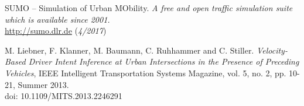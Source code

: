 \documentclass[11pt,letterpaper]{article}
\begin{document}
\begin{thebibliography}{5}
  		 SUMO – Simulation of Urban MObility.
  		\textit{A free and open traffic simulation suite which is available since 2001.}
  		\\\url{http://sumo.dlr.de} (\textit{4/2017})

       M. Liebner, F. Klanner, M. Baumann, C. Ruhhammer and C. Stiller.
      \textit{Velocity-Based Driver Intent Inference at Urban Intersections in the Presence of Preceding Vehicles},
      IEEE Intelligent Transportation Systems Magazine, vol. 5, no. 2, pp. 10-21, Summer 2013.
      \\doi: 10.1109/MITS.2013.2246291

\end{thebibliography}


\end{document}
